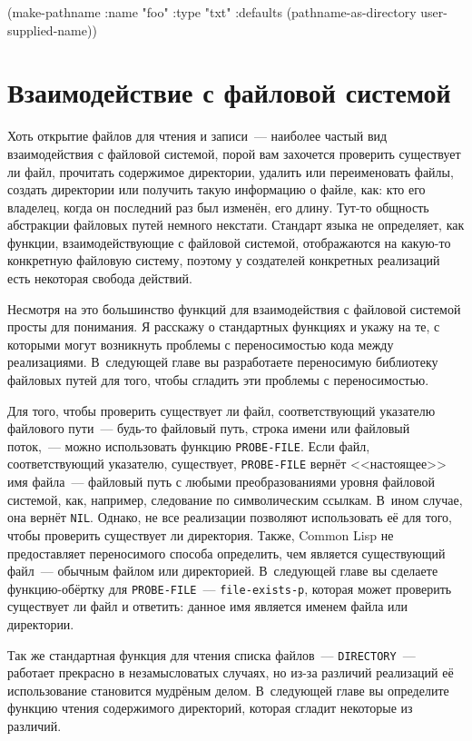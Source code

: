 \begin{myverb}
(make-pathname 
  :name "foo" :type "txt" :defaults (pathname-as-directory user-supplied-name))
\end{myverb}

\section{Взаимодействие с файловой системой}

Хоть открытие файлов для чтения и записи~--- наиболее частый вид взаимодействия с файловой
системой, порой вам захочется проверить существует ли файл, прочитать содержимое
директории, удалить или переименовать файлы, создать директории или получить такую
информацию о файле, как: кто его владелец, когда он последний раз был изменён, его
длину. Тут-то общность абстракции файловых путей немного некстати. Стандарт языка не
определяет, как функции, взаимодействующие с файловой системой, отображаются на какую-то
конкретную файловую систему, поэтому у создателей конкретных реализаций есть некоторая
свобода действий.

Несмотря на это большинство функций для взаимодействия с файловой системой просты для
понимания. Я расскажу о стандартных функциях и укажу на те, с которыми могут возникнуть
проблемы с переносимостью кода между реализациями. В~следующей главе вы разработаете
переносимую библиотеку файловых путей для того, чтобы сгладить эти проблемы с
переносимостью.

Для того, чтобы проверить существует ли файл, соответствующий указателю файлового пути~---
будь-то файловый путь, строка имени или файловый поток,~--- можно использовать функцию
\lstinline{PROBE-FILE}. Если файл, соответствующий указателю, существует, \lstinline{PROBE-FILE}
вернёт <<настоящее>> имя файла~--- файловый путь с любыми преобразованиями уровня файловой
системой, как, например, следование по символическим ссылкам. В~ином случае, она вернёт
\lstinline{NIL}. Однако, не все реализации позволяют использовать её для того, чтобы проверить
существует ли директория. Также, Common Lisp не предоставляет переносимого способа
определить, чем является существующий файл~--- обычным файлом или директорией. В~следующей
главе вы сделаете функцию-обёртку для \lstinline{PROBE-FILE}~--- \lstinline{file-exists-p}, которая
может проверить существует ли файл и ответить: данное имя является именем файла или
директории.

Так же стандартная функция для чтения списка файлов~--- \lstinline{DIRECTORY}~--- работает
прекрасно в незамысловатых случаях, но из-за различий реализаций её использование
становится мудрёным делом. В~следующей главе вы определите функцию чтения содержимого
директорий, которая сгладит некоторые из различий.

